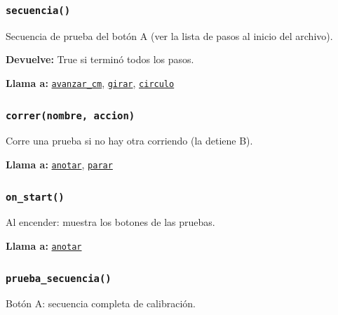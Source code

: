 \subsubsection{\texttt{secuencia()}}\label{fn:calibrations:secuencia}
\noindent Secuencia de prueba del botón A (ver la lista de pasos al inicio del archivo).

\noindent\textbf{Devuelve:} True si terminó todos los pasos.\par
\noindent\textbf{Llama a:} \hyperref[fn:calibrations:avanzar-cm]{\texttt{avanzar\_\allowbreak{}cm}}, \hyperref[fn:calibrations:girar]{\texttt{girar}}, \hyperref[fn:calibrations:circulo]{\texttt{circulo}}\par

\subsubsection{\texttt{correr(nombre, accion)}}\label{fn:calibrations:correr}
\noindent Corre una prueba si no hay otra corriendo (la detiene B).

\par{}\par\smallskip
\noindent\textbf{Llama a:} \hyperref[fn:calibrations:anotar]{\texttt{anotar}}, \hyperref[fn:calibrations:parar]{\texttt{parar}}\par

\subsubsection{\texttt{on\_\allowbreak{}start()}}\label{fn:calibrations:on-start}
\noindent Al encender: muestra los botones de las pruebas.

\noindent\textbf{Llama a:} \hyperref[fn:calibrations:anotar]{\texttt{anotar}}\par

\subsubsection{\texttt{prueba\_\allowbreak{}secuencia()}}\label{fn:calibrations:prueba-secuencia}
\noindent Botón A: secuencia completa de calibración.

